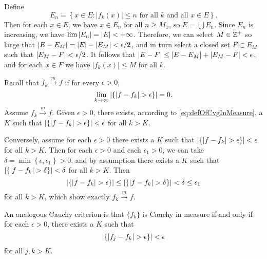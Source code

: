 
\begin{exercise}{4.15}
  Define
  \[
    E_n = \left\{ x \in E : \lvert f_k(x) \rvert \le n
    \text{ for all $k$ and all $x \in E$} \right\}.
  \]
  Then for each $x \in E$,
  we have $x \in E_n$ for all $n \ge M_x$,
  so $E = \bigcup E_n$.
  Since $E_n$ is increasing,
  we have $\lim \left\vert E_n\right\vert = \left\vert E\right\vert < +\infty$.
  Therefore, we can select $M \in \mathbb{Z}^+$ so large that
  $\left\vert E - E_M\right\vert = \left\vert E\right\vert - \left\vert E_M\right\vert < \epsilon/2$,
  and in turn select a closed set $F \subset E_M$ such that
  $\left\vert E_M - F\right\vert < \epsilon/2$.
  It follows that $\left\vert E - F\right\vert \le \left\vert E - E_M\right\vert + \left\vert E_M - F\right\vert < \epsilon$,
  and for each $x \in F$ we have
  $\lvert f_k(x) \rvert \le M$ for all $k$.
\end{exercise}

\begin{exercise}{4.16}
  Recall that $f_k \xrightarrow{m} f$ if for every $\epsilon > 0$,
  \begin{equation}
    \lim_{k \rightarrow \infty} \left\vert\left\{ \lvert f - f_k \rvert > \epsilon \right\}\right\vert = 0.
    \label{eq:defOfCvgInMeasure}
  \end{equation}
  Assume $f_k \xrightarrow{m} f$.
  Given $\epsilon > 0$,
  there exists, according to \eqref{eq:defOfCvgInMeasure}, a $K$ such that
  $\left\vert\left\{ \lvert f - f_k \rvert > \epsilon \right\}\right\vert < \epsilon$
  for all $k > K$.

  Conversely, assume for each $\epsilon > 0$ there exists a $K$ such that
  $\left\vert\left\{ \lvert f - f_k \rvert > \epsilon \right\}\right\vert < \epsilon$
  for all $k > K$.
  Then for each $\epsilon > 0$ and each $\epsilon_1 > 0$,
  we can take $\delta = \min \left\{ \epsilon, \epsilon_1 \right\} > 0$,
  and by assumption there exists a $K$ such that
  $\left\vert\left\{ \lvert f - f_k \rvert > \delta \right\}\right\vert < \delta$
  for all $k > K$.
  Then
  \[
    \left\vert\left\{ \lvert f - f_k \rvert > \epsilon \right\}\right\vert
    \le \left\vert\left\{ \lvert f - f_k \rvert > \delta \right\}\right\vert
    < \delta \le \epsilon_1
  \]
  for all $k > K$, which show exactly $f_k \xrightarrow{m} f$.

  An analogous Cauchy criterion is that
  $\{f_k\}$ is Cauchy in measure if and only if
  for each $\epsilon > 0$,
  there exists a $K$ such that
  \[
    \left\vert\left\{ \lvert f_j - f_k \rvert > \epsilon \right\}\right\vert < \epsilon
  \]
  for all $j, k > K$.
\end{exercise}
